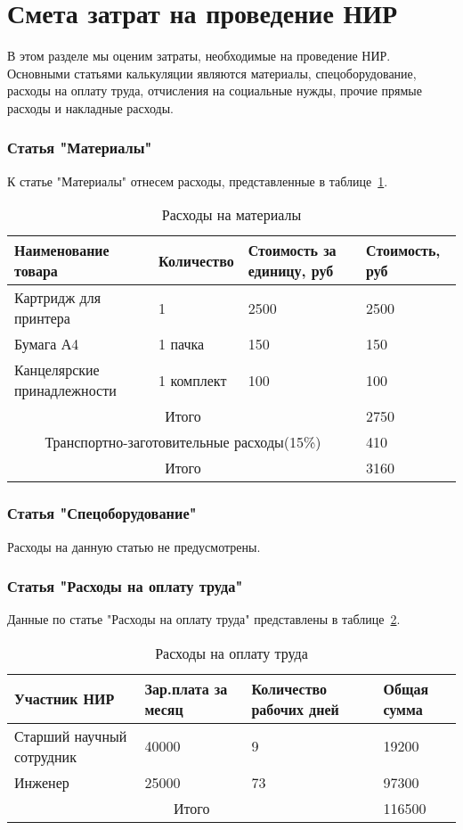 \section{Смета затрат на проведение НИР}
В этом разделе мы оценим затраты, необходимые на проведение НИР. Основными статьями калькуляции являются материалы, спецоборудование, расходы на оплату труда, отчисления на социальные нужды, прочие прямые расходы и накладные расходы.

\subsubsection{Статья "Материалы"}

К статье "Материалы" отнесем расходы, представленные в таблице~\ref{table2}.

\begin{table}[h!]\center
\caption{Расходы на материалы}\label{table2}
\begin{tabular}{|p{10em}|p{10em}|p{9em}|p{9em}|}
  \hline
  Наименование товара & Количество & Стоимость за единицу, руб & Стоимость, руб \\ \hline
  Картридж для принтера & 1 & 2500 & 2500 \\ \hline
  Бумага А4 & 1 пачка & 150 & 150 \\ \hline
  Канцелярские принадлежности & 1 комплект & 100 & 100 \\ \hline
  \multicolumn{3}{|c|}{Итого} & 2750 \\ \hline
  \multicolumn{3}{|c|}{Транспортно-заготовительные расходы(15\%)} & 410 \\ \hline
  \multicolumn{3}{|c|}{Итого} & 3160 \\ \hline
\end{tabular}
\end{table}

\subsubsection{Статья "Спецоборудование"}
  Расходы на данную статью не предусмотрены.

\subsubsection{Статья "Расходы на оплату труда"}

Данные по статье "Расходы на оплату труда" представлены в таблице~\ref{table3}.
\begin{table}[h!]
\caption{Расходы на оплату труда}\label{table3}
\begin{tabular}{|p{12em}|p{10em}|p{9em}|p{7em}|}
  \hline
  Участник НИР & Зар.плата за месяц & Количество рабочих дней & Общая сумма \\ \hline
  Старший научный сотрудник & 40000 & 9 & 19200 \\ \hline
  Инженер & 25000 & 73 & 97300 \\ \hline
  \multicolumn{3}{|c|}{Итого} & 116500 \\ \hline
\end{tabular}
\end{table}

